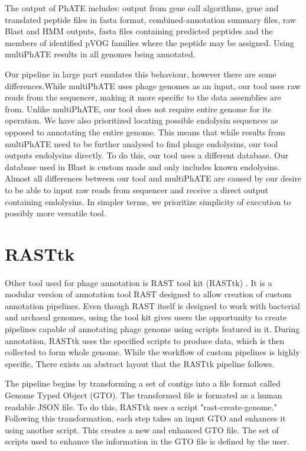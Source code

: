 The output of PhATE includes: output from gene call algorithms, gene and translated peptide files in fasta format, combined-annotation summary files, raw Blast and HMM outputs, fasta files containing predicted peptides and the members of identified pVOG families where the peptide may be assigned. Using multiPhATE results in all genomes being annotated.

Our pipeline in large part emulates this behaviour, however there are some differences.While multiPhATE uses phage genomes as an input, our tool uses raw reads from the sequencer, making it more specific to the data assemblies are from. Unlike multiPhATE, our tool does not require entire genome for its operation. We have also prioritized locating possible endolysin sequences as opposed to annotating the entire genome. This means that while results from multiPhATE need to be further analysed to find phage endolysins, our tool outputs endolysins directly. To do this, our tool uses a different database. Our database used in Blast is custom made and only includes known endolysins. Almost all differences between our tool and multiPhATE are caused by our desire to be able to input raw reads from sequencer and receive a direct output containing endolysins. In simpler terms, we prioritize simplicity of execution to possibly more versatile tool.

\section{RASTtk}
\paragraph*{}
Other tool used for phage annotation is RAST tool kit (RASTtk) \cite{brettin2015rasttk}. It is a modular version of annotation tool RAST designed to allow creation of custom annotation pipelines. Even though RAST itself is designed to work with bacterial and archaeal genomes, using the tool kit gives users the opportunity to create pipelines capable of annotating phage genome using scripts featured in it. During annotation, RASTtk uses the specified scripts to produce data, which is then collected to form whole genome. While the workflow of custom pipelines is highly specific, There exists an abstract layout that the RASTtk pipeline follows.

The pipeline begins by transforming a set of contigs into a file format called Genome Typed Object (GTO). The transformed file is formated as a human readable JSON file. To do this, RASTtk uses a script "rast-create-genome." Following this transformation, each step takes an input GTO and enhances it using another script. This creates a new and enhanced GTO file. The set of scripts used to enhance the information in the GTO file is defined by the user.

